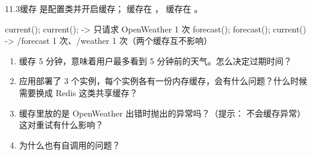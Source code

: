 \begin{task}{11.3\quad 缓存}
 是配置类并开启缓存； 缓存在 ， 缓存在 。

\begin{example}
\begin{plaincode}
current(); current();             ->  只请求 OpenWeather 1 次
forecast(); forecast(); current() ->  /forecast 1 次、/weather 1 次（两个缓存互不影响）
\end{plaincode}
\end{example}
\end{task}

\begin{think}
\begin{enumerate}
  \item 缓存 5 分钟，意味着用户最多看到 5 分钟前的天气。怎么决定过期时间？
  \item 应用部署了 3 个实例，每个实例各有一份内存缓存，会有什么问题？什么时候需要换成 Redis 这类共享缓存？
  \item 缓存里放的是 OpenWeather 出错时抛出的异常吗？（提示： 不会缓存异常）这对重试有什么影响？
  \item {} 为什么也有自调用的问题？
\end{enumerate}
\end{think}
